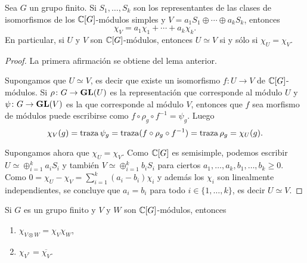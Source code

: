 \begin{theorem}
  Sea $G$ un grupo finito. Si $S_1,\dots,S_k$ son los representantes 
  de las clases de isomorfismos de los $\mathbb{C}[G]$-módulos simples y 
  $V=a_1S_1\oplus\cdots\oplus a_kS_k$, entonces
  \[
  \chi_V=a_1\chi_1+\cdots+a_k\chi_k.
  \]
  En particular, si $U$ y $V$ son $\mathbb{C}[G]$-módulos, 
  entonces $U\simeq V$ si y sólo si $\chi_U=\chi_V$.
\end{theorem}

\begin{proof}
    La primera afirmación se obtiene del lema anterior. 
    
    Supongamos que $U\simeq V$, es decir que existe un isomorfismo $f\colon U\to V$ de $\mathbb{C}[G]$-módulos. Si $\rho\colon G\to\mathbf{GL}(U)$ 
    es la representación que corresponde al módulo $U$ y $\psi\colon G\to\mathbf{GL}(V)$ es la que corresponde al módulo $V$, entonces
    que $f$ sea morfismo de módulos puede escribirse como 
    $f\circ\rho_g\circ f^{-1}=\psi_g$. Luego
    \[
    \chi_V(g)=\operatorname{traza}\psi_g=\operatorname{traza}(f\circ\rho_g\circ f^{-1})=\operatorname{traza}\rho_g=\chi_U(g).
    \]
    
    Supongamos ahora que $\chi_U=\chi_V$. Como $\mathbb{C}[G]$ es semisimple, podemos
    escribir $U\simeq \oplus_{i=1}^k a_iS_i$ y 
    también $V\simeq\oplus_{i=1}^k b_iS_i$ para ciertos $a_1,\dots,a_k,b_1,\dots,b_k\geq0$. 
    Como $0=\chi_U-\chi_V=\sum_{i=1}^k(a_i-b_i)\chi_i$ y además los $\chi_i$ son linealmente independientes, 
    se concluye que $a_i=b_i$ para todo $i\in\{1,\dots,k\}$, es decir $U\simeq V$.
\end{proof}

\begin{lemma}
	Si $G$ es un grupo finito y $V$ y $W$ son $\mathbb{C}[G]$-módulos, entonces 
	\begin{enumerate}
		\item $\chi_{V\otimes W}=\chi_V\chi_W$,
		\item $\chi_{V^*}=\overline{\chi_V}$.
	\end{enumerate}
\end{lemma}

